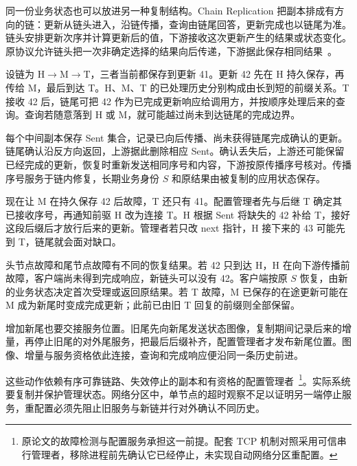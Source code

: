 同一份业务状态也可以放进另一种复制结构。Chain Replication 把副本排成有方向的链：更新从链头进入，沿链传播，查询由链尾回答，更新完成也以链尾为准。链头安排更新次序并计算更新后的值，下游接收这次更新产生的结果或状态变化。原协议允许链头把一次非确定选择的结果向后传递，下游据此保存相同结果~\cite{chain-replication2004}。

设链为 $\mathrm{H}\to\mathrm{M}\to\mathrm{T}$，三者当前都保存到更新 41。更新 42 先在 H 持久保存，再传给 M，最后到达 T。H、M、T 的已处理历史分别构成由长到短的前缀关系。T 接收 42 后，链尾可把 42 作为已完成更新响应给调用方，并按顺序处理后来的查询。查询若随意落到 H 或 M，就可能越过尚未到达链尾的完成边界。


每个中间副本保存 Sent 集合，记录已向后传播、尚未获得链尾完成确认的更新。链尾确认沿反方向返回，上游据此删除相应 Sent。确认丢失后，上游还可能保留已经完成的更新，恢复时重新发送相同序号和内容，下游按原传播序号核对。传播序号服务于链内修复，长期业务身份 $S$ 和原结果由被复制的应用状态保存。

现在让 M 在持久保存 42 后故障，T 还只有 41。配置管理者先与后继 T 确定其已接收序号，再通知前驱 H 改为连接 T。H 根据 Sent 将缺失的 42 补给 T，接好这段后缀后才放行后来的更新。管理者若只改 next 指针，H 接下来的 43 可能先到 T，链尾就会面对缺口。


头节点故障和尾节点故障有不同的恢复结果。若 42 只到达 H，H 在向下游传播前故障，客户端尚未得到完成响应，新链头可以没有 42。客户端按原 $S$ 恢复，由新的业务状态决定首次受理或返回原结果。若 T 故障，M 已保存的在途更新可能在 M 成为新尾时变成完成更新；此前已由旧 T 回复的前缀则全部保留。

增加新尾也要交接服务位置。旧尾先向新尾发送状态图像，复制期间记录后来的增量，再停止旧尾的对外尾服务，把最后后缀补齐，配置管理者才发布新尾位置。图像、增量与服务资格依此连接，查询和完成响应便沿同一条历史前进。


这些动作依赖有序可靠链路、失效停止的副本和有资格的配置管理者~\cite{chain-replication2004}\footnote{原论文的故障检测与配置服务承担这一前提。配套 TCP 机制对照采用可信串行管理者，移除进程前先确认它已经停止，未实现自动网络分区重配置。}。实际系统要复制并保护管理状态。网络分区中，单节点的超时观察不足以证明另一端停止服务，重配置必须先阻止旧服务与新链并行对外确认不同历史。
\FloatBarrier
